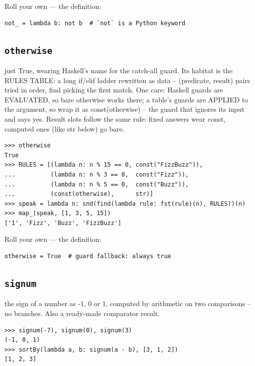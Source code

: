 \documentclass[10pt,letterpaper]{book}
\begin{document}
Roll your own --- the definition:

\begin{lstlisting}[style=ex]
not_ = lambda b: not b  # `not` is a Python keyword
\end{lstlisting}

\subsection{\texttt{otherwise}}\label{def:otherwise}
just True, wearing Haskell's name for the catch-all guard. Its habitat is the RULES TABLE: a long if/elif ladder rewritten as data -- (predicate, result) pairs tried in order, find picking the first match. One care: Haskell guards are EVALUATED, so bare otherwise works there; a table's guards are APPLIED to the argument, so wrap it as const(otherwise) -- the guard that ignores its input and says yes. Result slots follow the same rule: fixed answers wear const, computed ones (like str below) go bare.
\begin{lstlisting}[style=ex]
>>> otherwise
True
>>> RULES = [(lambda n: n % 15 == 0, const("FizzBuzz")),
...          (lambda n: n % 3 == 0,  const("Fizz")),
...          (lambda n: n % 5 == 0,  const("Buzz")),
...          (const(otherwise),      str)]
>>> speak = lambda n: snd(find(lambda rule: fst(rule)(n), RULES))(n)
>>> map_(speak, [1, 3, 5, 15])
['1', 'Fizz', 'Buzz', 'FizzBuzz']
\end{lstlisting}

Roll your own --- the definition:

\begin{lstlisting}[style=ex]
otherwise = True  # guard fallback: always true
\end{lstlisting}

\subsection{\texttt{signum}}\label{def:signum}
the sign of a number as -1, 0 or 1, computed by arithmetic on two comparisons -- no branches. Also a ready-made comparator result.
\begin{lstlisting}[style=ex]
>>> signum(-7), signum(0), signum(3)
(-1, 0, 1)
>>> sortBy(lambda a, b: signum(a - b), [3, 1, 2])
[1, 2, 3]
\end{lstlisting}
\end{document}
